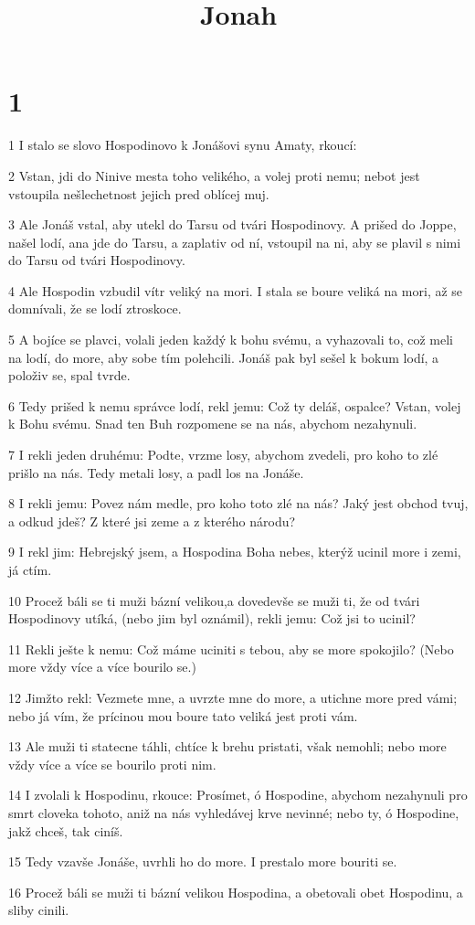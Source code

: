 

\title{Jonah}

\chapter{1}

\par 1 I stalo se slovo Hospodinovo k Jonášovi synu Amaty, rkoucí:
\par 2 Vstan, jdi do Ninive mesta toho velikého, a volej proti nemu; nebot jest vstoupila nešlechetnost jejich pred oblícej muj.
\par 3 Ale Jonáš vstal, aby utekl do Tarsu od tvári Hospodinovy. A prišed do Joppe, našel lodí, ana jde do Tarsu, a zaplativ od ní, vstoupil na ni, aby se plavil s nimi do Tarsu od tvári Hospodinovy.
\par 4 Ale Hospodin vzbudil vítr veliký na mori. I stala se boure veliká na mori, až se domnívali, že se lodí ztroskoce.
\par 5 A bojíce se plavci, volali jeden každý k bohu svému, a vyhazovali to, což meli na lodí, do more, aby sobe tím polehcili. Jonáš pak byl sešel k bokum lodí, a položiv se, spal tvrde.
\par 6 Tedy prišed k nemu správce lodí, rekl jemu: Což ty deláš, ospalce? Vstan, volej k Bohu svému. Snad ten Buh rozpomene se na nás, abychom nezahynuli.
\par 7 I rekli jeden druhému: Podte, vrzme losy, abychom zvedeli, pro koho to zlé prišlo na nás. Tedy metali losy, a padl los na Jonáše.
\par 8 I rekli jemu: Povez nám medle, pro koho toto zlé na nás? Jaký jest obchod tvuj, a odkud jdeš? Z které jsi zeme a z kterého národu?
\par 9 I rekl jim: Hebrejský jsem, a Hospodina Boha nebes, kterýž ucinil more i zemi, já ctím.
\par 10 Procež báli se ti muži bázní velikou,a dovedevše se muži ti, že od tvári Hospodinovy utíká, (nebo jim byl oznámil), rekli jemu: Což jsi to ucinil?
\par 11 Rekli ješte k nemu: Což máme uciniti s tebou, aby se more spokojilo? (Nebo more vždy více a více bourilo se.)
\par 12 Jimžto rekl: Vezmete mne, a uvrzte mne do more, a utichne more pred vámi; nebo já vím, že prícinou mou boure tato veliká jest proti vám.
\par 13 Ale muži ti statecne táhli, chtíce k brehu pristati, však nemohli; nebo more vždy více a více se bourilo proti nim.
\par 14 I zvolali k Hospodinu, rkouce: Prosímet, ó Hospodine, abychom nezahynuli pro smrt cloveka tohoto, aniž na nás vyhledávej krve nevinné; nebo ty, ó Hospodine, jakž chceš, tak ciníš.
\par 15 Tedy vzavše Jonáše, uvrhli ho do more. I prestalo more bouriti se.
\par 16 Procež báli se muži ti bázní velikou Hospodina, a obetovali obet Hospodinu, a sliby cinili.

